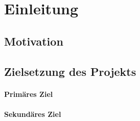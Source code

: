 \section{Einleitung}
\subsection{Motivation}
\subsection{Zielsetzung des Projekts} 
\paragraph{Primäres Ziel}
\paragraph{Sekundäres Ziel}